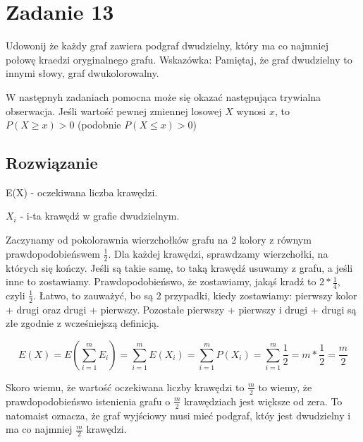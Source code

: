 
\section{Zadanie 13}
Udowonij że każdy graf zawiera podgraf dwudzielny, który ma co najmniej połowę kraedzi oryginalnego grafu. Wskazówka: Pamiętaj, że graf dwudzielny to innymi słowy, graf dwukolorowalny.

W następnyh zadaniach pomocna może się okazać następująca trywialna obserwacja. Jeśli wartość pewnej zmiennej losowej \(X\) wynosi \(x\), to \(P(X \geq x) > 0\) (podobnie \(P(X \leq x) > 0\))

\subsection*{Rozwiązanie}

E(X) - oczekiwana liczba krawędzi.

\(X_i\) - i-ta krawędź w grafie dwudzielnym.

Zaczynamy od pokolorawnia wierzchołków grafu na 2 kolory z równym prawdopodobieńswem \(\frac{1}{2}\). Dla każdej krawędzi, sprawdzamy wierzchołki, na których się kończy. Jeśli są takie samę, to taką krawędź usuwamy z grafu, a jeśli inne to zostawiamy. Prawdopodobieńswo, że zostawiamy, jakąś kradź to \(2*\frac{1}{4}\), czyli \(\frac{1}{2}\). Łatwo, to zauważyć, bo są 2 przypadki, kiedy zostawiamy: pierwszy kolor + drugi oraz drugi + pierwszy. Pozostałe pierwszy + pierwszy i drugi + drugi są złe zgodnie z wcześniejszą definicją.


\[
	E(X) = E(\sum_{i = 1}^{m} E_i) = \sum_{i = 1}^{m} E(X_i) = \sum_{i = 1}^{m} P(X_i) = \sum_{i = 1}^{m} \frac{1}{2} = m * \frac{1}{2} = \frac{m}{2}
\]

Skoro wiemu, że wartość oczekiwana liczby krawędzi to \(\frac{m}{2}\) to wiemy, że prawdopodobieńswo istenienia grafu o \(\frac{m}{2}\) krawędziach jest większe od zera. To natomaist oznacza, że  graf wyjściowy musi mieć podgraf, któy jest dwudzielny i ma co najmniej \(\frac{m}{2}\) krawędzi.